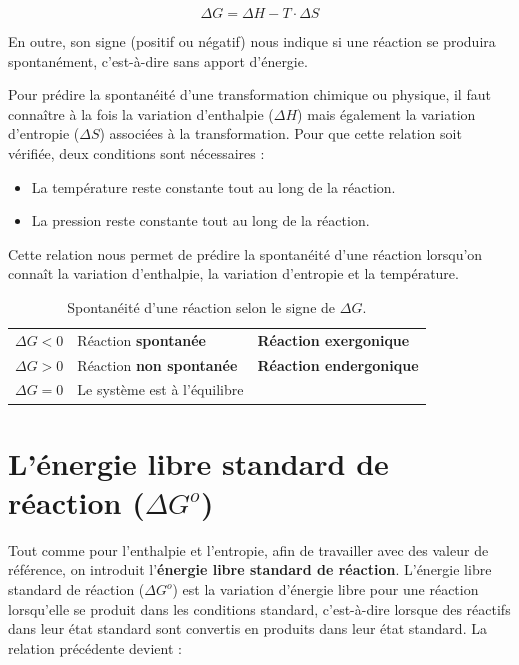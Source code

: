 \documentclass[
  11pt,
  a4paper,
  openany]{book}
\providecommand{\tightlist}{%
  \setlength{\itemsep}{0pt}\setlength{\parskip}{0pt}}
\begin{document}
\[
\Delta G = \Delta H - T \cdot \Delta S
\]

En outre, son signe (positif ou négatif) nous indique si une réaction se produira spontanément, c'est-à-dire sans apport d'énergie.

\clearpage

Pour prédire la spontanéité d'une transformation chimique ou physique, il faut connaître à la fois la variation d'enthalpie (\(\Delta H\)) mais également la variation d'entropie (\(\Delta S\)) associées à la transformation. Pour que cette relation soit vérifiée, deux conditions sont nécessaires :

\begin{itemize}
\tightlist
\item
  La température reste constante tout au long de la réaction.
\item
  La pression reste constante tout au long de la réaction.
\end{itemize}

Cette relation nous permet de prédire la spontanéité d'une réaction lorsqu'on connaît la variation d'enthalpie, la variation d'entropie et la température.

\begin{longtable}[]{@{}
  >{\centering\arraybackslash}p{}
  >{\raggedright\arraybackslash}p{}
  >{\raggedright\arraybackslash}p{}@{}}
\caption{\label{tab:spontaneitedHdS} Spontanéité d'une réaction selon le signe de \(\Delta G\).}\tabularnewline
\toprule\noalign{}
\endfirsthead
\endhead
\bottomrule\noalign{}
\endlastfoot
\(\Delta G < 0\) & Réaction \textbf{spontanée} & \textbf{Réaction exergonique} \\
\(\Delta G > 0\) & Réaction \textbf{non spontanée} & \textbf{Réaction endergonique} \\
\(\Delta G = 0\) & Le système est à l'équilibre & \\
\end{longtable}

\section{\texorpdfstring{L'énergie libre standard de réaction (\(\Delta G^o\))}{L'énergie libre standard de réaction (\textbackslash Delta G\^{}o)}}\label{luxe9nergie-libre-standard-de-ruxe9action-delta-go}

Tout comme pour l'enthalpie et l'entropie, afin de travailler avec des valeur de référence, on introduit l'\textbf{énergie libre standard de réaction}. L'énergie libre standard de réaction (\(\Delta G^o\)) est la variation d'énergie libre pour une réaction lorsqu'elle se produit dans les conditions standard, c'est-à-dire lorsque des réactifs dans leur état standard sont convertis en produits dans leur état standard. La relation précédente devient :
\end{document}
